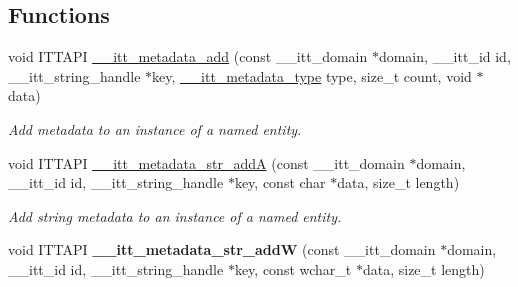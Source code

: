 \subsection*{Functions}
\begin{DoxyCompactItemize}
\item 
void I\+T\+T\+A\+P\+I \hyperlink{group__metadata_ga1acb78b07e5c93582ee1974bf8073038}{\+\_\+\+\_\+itt\+\_\+metadata\+\_\+add} (const \+\_\+\+\_\+itt\+\_\+domain $\ast$domain, \+\_\+\+\_\+itt\+\_\+id id, \+\_\+\+\_\+itt\+\_\+string\+\_\+handle $\ast$key, \hyperlink{group__metadata_ga906320efadd24c37fc2ee021e880a673}{\+\_\+\+\_\+itt\+\_\+metadata\+\_\+type} type, size\+\_\+t count, void $\ast$data)
\begin{DoxyCompactList}\small\item\em Add metadata to an instance of a named entity. \end{DoxyCompactList}\item 
void I\+T\+T\+A\+P\+I \hyperlink{group__metadata_ga1c0cbd4717ce08bf6a83fc84bf0a58e2}{\+\_\+\+\_\+itt\+\_\+metadata\+\_\+str\+\_\+add\+A} (const \+\_\+\+\_\+itt\+\_\+domain $\ast$domain, \+\_\+\+\_\+itt\+\_\+id id, \+\_\+\+\_\+itt\+\_\+string\+\_\+handle $\ast$key, const char $\ast$data, size\+\_\+t length)
\begin{DoxyCompactList}\small\item\em Add string metadata to an instance of a named entity. \end{DoxyCompactList}\item 
\hypertarget{group__metadata_ga53baf7d63f0b91a61d4b7ea9c8a6f09d}{}void I\+T\+T\+A\+P\+I {\bfseries \+\_\+\+\_\+itt\+\_\+metadata\+\_\+str\+\_\+add\+W} (const \+\_\+\+\_\+itt\+\_\+domain $\ast$domain, \+\_\+\+\_\+itt\+\_\+id id, \+\_\+\+\_\+itt\+\_\+string\+\_\+handle $\ast$key, const wchar\+\_\+t $\ast$data, size\+\_\+t length)\label{group__metadata_ga53baf7d63f0b91a61d4b7ea9c8a6f09d}


\end{DoxyCompactItemize}
